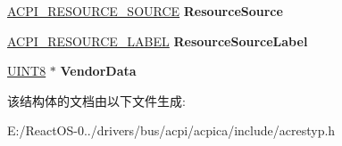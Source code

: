 \begin{DoxyCompactItemize}
\item 
\mbox{\label{structacpi__resource__pin__group__config_a9daaa932275f149f0373b00ce79b5e49}} 
\hyperlink{structacpi__resource__source}{A\+C\+P\+I\+\_\+\+R\+E\+S\+O\+U\+R\+C\+E\+\_\+\+S\+O\+U\+R\+CE} {\bfseries Resource\+Source}
\item 
\mbox{\label{structacpi__resource__pin__group__config_afd5f88c4a1d88d2e8509fb83229d72ef}} 
\hyperlink{structacpi__resource__label}{A\+C\+P\+I\+\_\+\+R\+E\+S\+O\+U\+R\+C\+E\+\_\+\+L\+A\+B\+EL} {\bfseries Resource\+Source\+Label}
\item 
\mbox{\label{structacpi__resource__pin__group__config_a71caa739ae2b18b75feea90a15d10265}} 
\hyperlink{_processor_bind_8h_ab27e9918b538ce9d8ca692479b375b6a}{U\+I\+N\+T8} $\ast$ {\bfseries Vendor\+Data}
\end{DoxyCompactItemize}


该结构体的文档由以下文件生成\+:\begin{DoxyCompactItemize}
\item 
E\+:/\+React\+O\+S-\/0../drivers/bus/acpi/acpica/include/acrestyp.\+h\end{DoxyCompactItemize}
